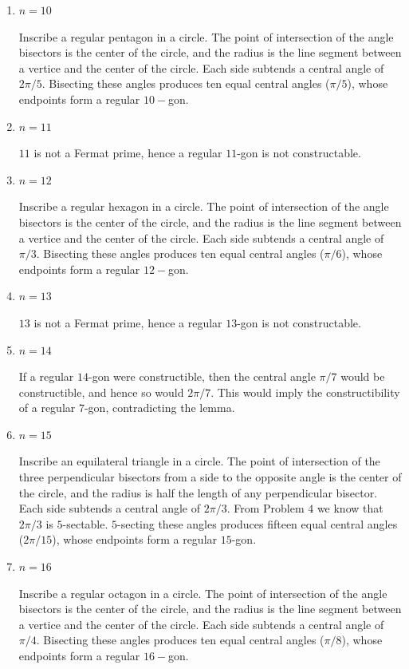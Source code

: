 \documentclass[12pt]{article}
\begin{document}
\begin{solution}
\begin{enumerate}
        \item $n = 10$
        
        Inscribe a regular pentagon in a circle. The point of intersection of the angle bisectors is the center of the circle, and the radius is the line segment between a vertice and the center of the circle. Each side subtends a central angle of $2\pi/5$. Bisecting these angles produces ten equal central angles ($\pi/5$), whose endpoints form a regular $10-$gon.

        \item $n = 11$
        
        $11$ is not a Fermat prime, hence a regular $11$-gon is not constructable. 

        \item $n = 12$
        
        Inscribe a regular hexagon in a circle. The point of intersection of the angle bisectors is the center of the circle, and the radius is the line segment between a vertice and the center of the circle. Each side subtends a central angle of $\pi/3$. Bisecting these angles produces ten equal central angles ($\pi/6$), whose endpoints form a regular $12-$gon.

        \item $n = 13$
        
        $13$ is not a Fermat prime, hence a regular $13$-gon is not constructable. 

        \item $n = 14$
        
        If a regular $14$-gon were constructible, then the central angle $\pi/7$ would be constructible, and hence so would $2\pi/7$. This would imply the constructibility of a regular $7$-gon, contradicting the lemma.

        \item $n = 15$
        
        Inscribe an equilateral triangle in a circle. The point of intersection of the three perpendicular bisectors from a side to the opposite angle is the center of the circle, and the radius is half the length of any perpendicular bisector. Each side subtends a central angle of $2\pi/3$. From Problem $4$ we know that $2\pi/3$ is $5$-sectable. $5$-secting these angles produces fifteen equal central angles ($2\pi/15$), whose endpoints form a regular $15$-gon.

        
        \item $n = 16$
        
        Inscribe a regular octagon in a circle. The point of intersection of the angle bisectors is the center of the circle, and the radius is the line segment between a vertice and the center of the circle. Each side subtends a central angle of $\pi/4$. Bisecting these angles produces ten equal central angles ($\pi/8$), whose endpoints form a regular $16-$gon.

    \end{enumerate}
\end{solution}
\end{document}
